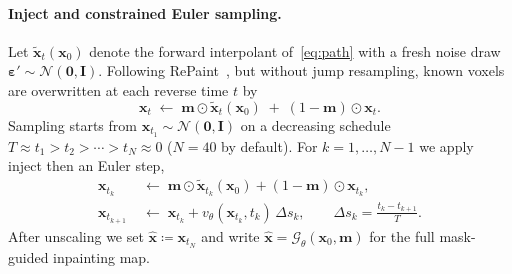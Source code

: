 \documentclass[letterpaper]{article} %
\begin{document}
\paragraph{Inject and constrained Euler sampling.}
Let \(\tilde{\mathbf{x}}_t(\mathbf{x}_0)\) denote the forward interpolant
of~\eqref{eq:path} with a fresh noise draw
\(\boldsymbol{\varepsilon}'\sim\mathcal{N}(\mathbf{0},\mathbf{I})\).
Following RePaint~\cite{lugmayr2022repaint}, but without jump resampling,
known voxels are overwritten at each reverse time \(t\) by
\begin{equation}
\label{eq:inject}
\mathbf{x}_t
\;\leftarrow\;
\mathbf{m}\odot\tilde{\mathbf{x}}_t(\mathbf{x}_0)
\;+\;
(1-\mathbf{m})\odot\mathbf{x}_t.
\end{equation}
Sampling starts from \(\mathbf{x}_{t_1}\sim\mathcal{N}(\mathbf{0},\mathbf{I})\)
on a decreasing schedule
\(T\approx t_1>t_2>\cdots>t_N\approx 0\)
(\(N{=}40\) by default). For \(k=1,\dots,N-1\) we apply inject
then an Euler step,
\begin{equation}
\label{eq:sampler}
\begin{aligned}
\mathbf{x}_{t_k}
&\;\leftarrow\;
\mathbf{m}\odot\tilde{\mathbf{x}}_{t_k}(\mathbf{x}_0)
+(1-\mathbf{m})\odot\mathbf{x}_{t_k},\\
\mathbf{x}_{t_{k+1}}
&\;\leftarrow\;
\mathbf{x}_{t_k}
+
v_\theta(\mathbf{x}_{t_k},t_k)\,\Delta s_k,
\qquad
\Delta s_k=\tfrac{t_k-t_{k+1}}{T}.
\end{aligned}
\end{equation}
After unscaling we set \(\hat{\mathbf{x}}\coloneqq\mathbf{x}_{t_N}\) and write
\(\hat{\mathbf{x}}=\mathcal{G}_\theta(\mathbf{x}_0,\mathbf{m})\) for the full
mask-guided inpainting map.
\end{document}
